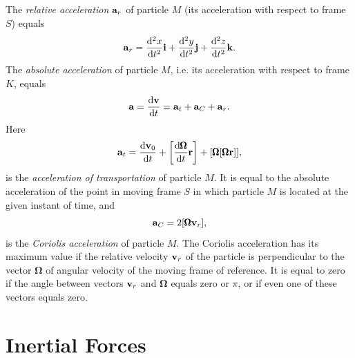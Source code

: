 \subsection{}\label{7.1.3} The \emph{relative acceleration} $\vb{a}_{r}$ of particle $M$ (its acceleration with respect to frame $S$) equals
\begin{equation*}%
\vb{a}_{r} = \dv[2]{x}{t} \vb{i} +\dv[2]{y}{t} \vb{j} + \dv[2]{z}{t} \vb{k}.
\end{equation*}
The \emph{absolute acceleration} of particle $M$, i.e. its acceleration with respect to frame $K$, equals
\begin{equation*}%
\vb{a} = \dv{\vb{v}}{t} = \vb{a}_{t} + \vb{a}_{C}  + \vb{a}_{r}.
\end{equation*}
Here
\begin{equation*}%
\vb{a}_{t} = \dv{\vb{v}_{0}}{t} + \left[ \dv{\pmb{\Omega}}{t} \vb{r} \right] + \qty[\pmb{\Omega}[\pmb{\Omega}\vb{r}]],
\end{equation*}
is the \emph{acceleration of transportation} of particle $M$. It is equal to the absolute acceleration of the point in moving frame $S$ in which particle $M$ is located at the given instant of time, and
\begin{equation*}%
\vb{a}_{C} = 2\qty[\pmb{\Omega}\vb{v}_{r}],
\end{equation*}
is the \emph{Coriolis acceleration} of particle $M$. The Coriolis accelera­tion has its maximum value if the relative velocity $\vb{v}_{r}$ of the particle is perpendicular to the vector $\pmb{\Omega}$ of angular velocity of the moving frame of reference. It is equal to zero if the angle between vectors $\vb{v}_{r}$ and $\pmb{\Omega}$ equals zero or $\pi$, or if even one of these vectors equals zero.

\section{Inertial Forces}
\label{sec-7.2}

